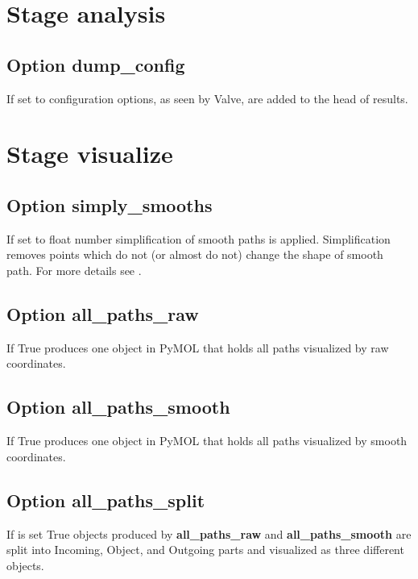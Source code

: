 \documentclass[a4paper,10pt,english]{sphinxmanual}
\begin{document}
\section{Stage \textbf{analysis}}
\label{valve/valve_config:stage-analysis}

\subsection{Option \textbf{dump\_config}}
\label{valve/valve_config:option-dump-config}
If set to  configuration options, as seen by Valve, are added to the head of results.


\section{Stage \textbf{visualize}}
\label{valve/valve_config:stage-visualize}

\subsection{Option \textbf{simply\_smooths}}
\label{valve/valve_config:option-simply-smooths}
If set to float number simplification of smooth paths is applied.
Simplification removes points which do not (or almost do not) change the shape of smooth path. For more details see {\hyperref[aqueduct.geom.traces:simply\string-smooths\string-details]{}}.


\subsection{Option \textbf{all\_paths\_raw}}
\label{valve/valve_config:option-all-paths-raw}
If True produces one object in PyMOL that holds all paths visualized by raw coordinates.


\subsection{Option \textbf{all\_paths\_smooth}}
\label{valve/valve_config:option-all-paths-smooth}
If True produces one object in PyMOL that holds all paths visualized by smooth coordinates.


\subsection{Option \textbf{all\_paths\_split}}
\label{valve/valve_config:option-all-paths-split}
If is set True objects produced by \textbf{all\_paths\_raw} and \textbf{all\_paths\_smooth} are split into Incoming, Object, and Outgoing parts and visualized as three different objects.
\end{document}
